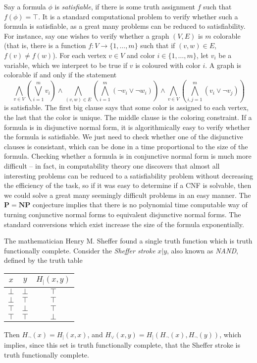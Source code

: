 Say a formula $\phi$ is \emph{satisfiable}, if there is some truth assignment $f$ such that $f(\phi) = \top$. It is a standard computational problem to verify whether such a formula is satisfiable, as a great many problems can be reduced to satisfiability. For instance, say one wishes to verify whether a graph $(V,E)$ is $m$ colorable (that is, there is a function $f: V \to \{ 1, \dots, m \}$ such that if $(v,w) \in E$, $f(v) \neq f(w)$). For each vertex $v \in V$ and color $i \in \{ 1, \dots, m \}$, let $v_i$ be a variable, which we interpret to be true if $v$ is coloured with color $i$. A graph is colorable if and only if the statement
%
\[ \bigwedge_{v \in V} \left( \bigvee_{i = 1}^m v_i \right) \wedge \bigwedge_{(v,w) \in E} \left( \bigwedge_{i = 1}^m (\neg v_i \vee \neg w_i) \right) \wedge \bigwedge_{v \in V} \left( \bigwedge_{i,j = 1}^m (v_i \vee \neg v_j) \right) \]
%
is satisfiable. The first big clause says that some color is assigned to each vertex, the last that the color is unique. The middle clause is the coloring constraint. If a formula is in disjunctive normal form, it is algorithmically easy to verify whether the formula is satisfiable. We just need to check whether one of the disjunctive clauses is consistant, which can be done in a time proportional to the size of the formula. Checking whether a formula is in conjunctive normal form is much more difficult -- in fact, in computability theory one discovers that almost all interesting problems can be reduced to a satisfiability problem without decreasing the efficiency of the task, so if it was easy to determine if a CNF is solvable, then we could solve a great many seemingly difficult problems in an easy manner. The $\mathbf{P} = \mathbf{NP}$ conjecture implies that there is no polynomial time computable way of turning conjunctive normal forms to equivalent disjunctive normal forms. The standard conversions which exist increase the size of the formula exponentially.

\begin{example}
    The mathematician Henry M. Sheffer found a single truth function which is truth functionally complete. Consider the \emph{Sheffer stroke} $x|y$, also known as \emph{NAND}, defined by the truth table
    \begin{center}
    \begin{tabular}{| c | c | c |}
        \hline $x$ & $y$ & $H_|(x,y)$\\
        \hline $\bot$ & $\bot$ & $\top$\\
        $\bot$ & $\top$ & $\top$\\
        $\top$ & $\bot$ & $\top$\\
        $\top$ & $\top$ & $\bot$\\
        \hline
    \end{tabular}
    \end{center}
    Then $H_\neg(x) = H_|(x,x)$, and $H_\vee(x,y) = H_|(H_\neg(x), H_\neg(y))$, which implies, since this set is truth functionally complete, that the Sheffer stroke is truth functionally complete.
\end{example}

